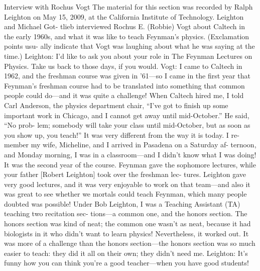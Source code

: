 \documentclass[11pt,oneside]{article}
\begin{document}
Interview with Rochus Vogt The material for this section was recorded by Ralph Leighton on May 15, 2009, at the California Institute of Technology. Leighton and Michael Got- tlieb interviewed Rochus E. (Robbie) Vogt about Caltech in the early 1960s, and what it was like to teach Feynman’s physics. (Exclamation points usu- ally indicate that Vogt was laughing about what he was saying at the time.) Leighton: I’d like to ask you about your role in The Feynman Lectures on Physics. Take us back to those days, if you would. Vogt: I came to Caltech in 1962, and the freshman course was given in ’61---so I came in the first year that Feynman’s freshman course had to be translated into something that common people could do---and it was quite a challenge! When Caltech hired me, I told Carl Anderson, the physics department chair, “I’ve got to finish up some important work in Chicago, and I cannot get away until mid-October.” He said, “No prob- lem; somebody will take your class until mid-October, but as soon as you show up, you teach!” It was very different from the way it is today. I re- member my wife, Micheline, and I arrived in Pasadena on a Saturday af- ternoon, and Monday morning, I was in a classroom---and I didn’t know what I was doing! It was the second year of the course. Feynman gave the sophomore lectures, while your father [Robert Leighton] took over the freshman lec- tures. Leighton gave very good lectures, and it was very enjoyable to work on that team---and also it was great to see whether we mortals could teach Feynman, which many people doubted was possible! Under Bob Leighton, I was a Teaching Assistant (TA) teaching two recitation sec- tions---a common one, and the honors section. The honors section was kind of neat; the common one wasn’t as neat, because it had biologists in it who didn’t want to learn physics! Nevertheless, it worked out. It was more of a challenge than the honors section---the honors section was so much easier to teach: they did it all on their own; they didn’t need me. Leighton: It’s funny how you can think you’re a good teacher---when you have good students!\par
\end{document}
